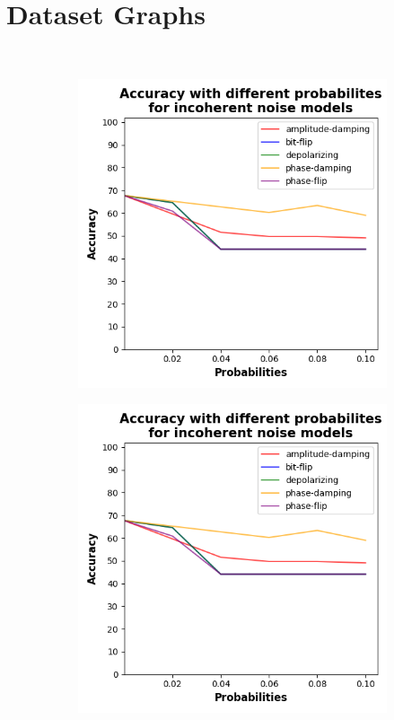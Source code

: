 \chapter{Dataset Graphs}\label{chapter:appendix-iris} \

\begin{figure}[!b]
    \centering

    \begin{subfigure}{0.40\textwidth}
        \includegraphics[width=\linewidth]{figures/accuracy-graph.png}
        \label{fig:arm1}
    \end{subfigure}
    \begin{subfigure}{0.40\textwidth}
        \includegraphics[width=\linewidth]{figures/accuracy-graph.png}
        \label{fig:arm2}
    \end{subfigure}


\end{figure}
